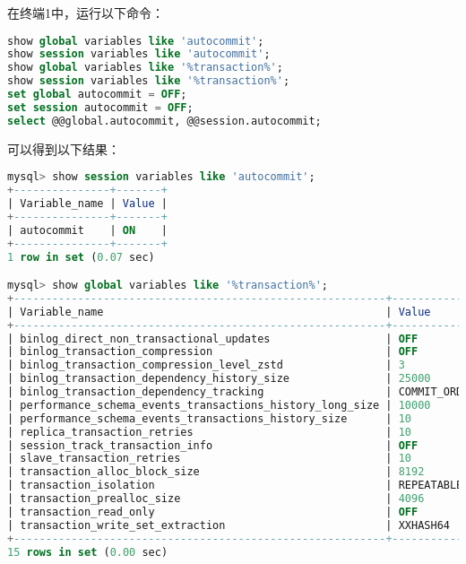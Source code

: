 \documentclass{article}
\begin{document}
在终端1中，运行以下命令：

\begin{lstlisting}[language=sql]
show global variables like 'autocommit'; 
show session variables like 'autocommit'; 
show global variables like '%transaction%'; 
show session variables like '%transaction%'; 
set global autocommit = OFF; 
set session autocommit = OFF; 
select @@global.autocommit, @@session.autocommit; 
\end{lstlisting}

可以得到以下结果：

\begin{lstlisting}[language=sql]
mysql> show session variables like 'autocommit';
+---------------+-------+
| Variable_name | Value |
+---------------+-------+
| autocommit    | ON    |
+---------------+-------+
1 row in set (0.07 sec)

mysql> show global variables like '%transaction%';
+----------------------------------------------------------+-----------------+
| Variable_name                                            | Value           |
+----------------------------------------------------------+-----------------+
| binlog_direct_non_transactional_updates                  | OFF             |
| binlog_transaction_compression                           | OFF             |
| binlog_transaction_compression_level_zstd                | 3               |
| binlog_transaction_dependency_history_size               | 25000           |
| binlog_transaction_dependency_tracking                   | COMMIT_ORDER    |
| performance_schema_events_transactions_history_long_size | 10000           |
| performance_schema_events_transactions_history_size      | 10              |
| replica_transaction_retries                              | 10              |
| session_track_transaction_info                           | OFF             |
| slave_transaction_retries                                | 10              |
| transaction_alloc_block_size                             | 8192            |
| transaction_isolation                                    | REPEATABLE-READ |
| transaction_prealloc_size                                | 4096            |
| transaction_read_only                                    | OFF             |
| transaction_write_set_extraction                         | XXHASH64        |
+----------------------------------------------------------+-----------------+
15 rows in set (0.00 sec)


\end{lstlisting}
\end{document}
